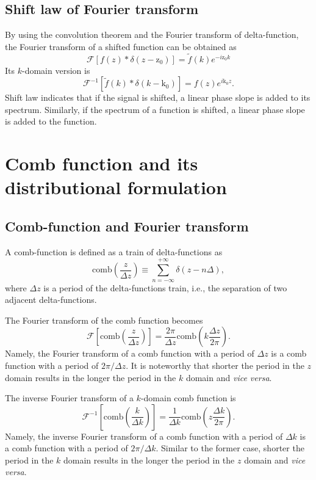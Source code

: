 \documentclass[a4paper]{article}
\newcommand{\ftf}[1]{{\mathcal{F}\left[#1\right]\xspace}}
\newcommand{\iftf}[1]{{\mathcal{F}^{-1}\left[#1\right]\xspace}}
\newcommand{\ftt}[1]{{\tilde{#1}\xspace}}
\newcommand{\comb}[1]{{\mathrm{comb}\left( #1 \right)}\xspace}
\newcommand{\Dz}{{\Delta z}\xspace}
\newcommand{\Dk}{{\Delta k}\xspace}
\newcommand{\vcvs}{{\textit{vice versa}\xspace}}
\begin{document}
\subsection{Shift law of Fourier transform}
By using the convolution theorem and the Fourier transform of delta-function, the Fourier transform of a shifted function can be obtained as
\begin{equation}
	\ftf{ f(z) * \delta\left(z-\mathrm{z_0}\right)} = \ftt{f}(k) e^{-i \mathrm{z_0} k}
\end{equation}
Its $k$-domain version is
\begin{equation}
	\iftf{\ftt{f}(k)* \delta\left(k- \mathrm{k_0}\right)} = f(z) e^{i \mathrm{k_0} z}.
\end{equation}
Shift law indicates that if the signal is shifted, a linear phase slope is added to its spectrum.
Similarly, if the spectrum of a function is shifted, a linear phase slope is added to the function.

\section{Comb function and its distributional formulation}
\subsection{Comb-function and Fourier transform}
A comb-function is defined as a train of delta-functions as
\begin{equation}
	\comb{ \frac{z}{\Dz} }
	\equiv \sum_{n = -\infty}^{+\infty} \delta\left( z- n\Delta \right),
\end{equation}
where $\Delta z$ is a period of the delta-functions train, i.e., the separation of two adjacent delta-functions.

The Fourier transform of the comb function becomes
\begin{equation}
	\label{eq:ftCombZ}
	\ftf{ \comb{\frac{z}{\Dz}} }  = \frac{2\pi}{\Dz} \comb{k\frac{\Dz}{2 \pi}}.
\end{equation}
Namely, the Fourier transform of a comb function with a period of $\Delta z$ is a comb function with a period of $2\pi/\Dz$.
It is noteworthy that shorter the period in the $z$ domain results in the longer the period in the $k$ domain and \vcvs.

The inverse Fourier transform of a $k$-domain comb function is
\begin{equation}
	\iftf{\comb{\frac{k}{\Dk}}} = \frac{1}{\Dk} \comb{z\frac{\Dk}{2\pi}}.
\end{equation}
Namely, the inverse Fourier transform of a comb function with a period of $\Dk$ is a comb function with a period of $2\pi/\Dk$.
Similar to the former case, shorter the period in the $k$ domain results in the longer the period in the $z$ domain and \vcvs.
\end{document}
